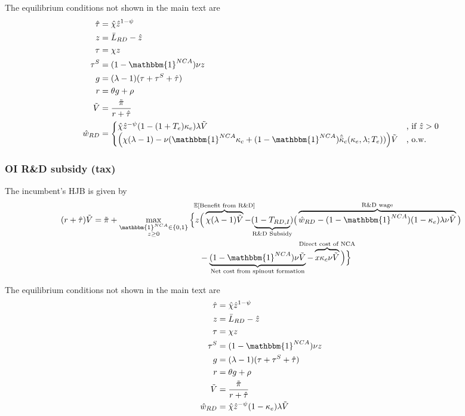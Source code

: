 \documentclass[11pt,english]{article}
\begin{document}
The equilibrium conditions not shown in the main text are
\begin{align}
\hat{\tau} &= \hat{\chi} \hat{z}^{1-\psi} \\
z &= \bar{L}_{RD} - \hat{z} \label{eq:labor_resource_constraint_entryTax}\\ 
\tau &= \chi z \\
\tau^S &= (1-\mathbbm{1}^{NCA}) \nu z \\
g &= (\lambda - 1) (\tau + \tau^S + \hat{\tau}) \\
r &= \theta g + \rho \\
\tilde{V} &= \frac{\tilde{\pi}}{r + \hat{\tau}} \\ 
\hat{w}_{RD} &= \begin{cases}
\hat{\chi} \hat{z}^{-\psi} (1-(1+T_e)\kappa_e) \lambda \tilde{V} &\textrm{, if } \hat{z} > 0\\
\Big( \chi(\lambda -1) - \nu (\mathbbm{1}^{NCA}\kappa_c + (1-\mathbbm{1}^{NCA})\hat{\bar{\kappa}}_c(\kappa_e,\lambda;T_e))\Big) \tilde{V} &\textrm{, o.w.}
\end{cases} \label{eq:wage_rd_labor_entryTax}
\end{align}


\subsubsection{OI R\&D subsidy (tax)}\label{appendix:model:efficiencyderivations:OIRDtax}

The incumbent's HJB is given by
\begin{align}
(r + \hat{\tau}) \tilde{V} = \tilde{\pi} + \max_{\substack{\mathbbm{1}^{NCA} \in \{0,1\} \\ z \ge 0}} \Big\{z &\Big( \overbrace{\chi (\lambda - 1) \tilde{V}}^{\mathclap{\mathbb{E}[\textrm{Benefit from R\&D}]}}- (\underbrace{1-T_{RD,I}}_{\mathclap{\text{R\&D Subsidy}}}) \big( \overbrace{\hat{w}_{RD} - (1-\mathbbm{1}^{NCA})(1-\kappa_e)\lambda \nu \tilde{V}}^{\mathclap{\text{R\&D wage}}}\big) \label{eq:hjb_incumbent_RDsubsidyTargeted} \nonumber \\ 
&-  \underbrace{(1-\mathbbm{1}^{NCA}) \nu \tilde{V}}_{\mathclap{\text{Net cost from spinout formation}}} - \overbrace{x \kappa_{c} \nu \tilde{V}}^{\mathclap{\text{Direct cost of NCA}}}\Big) \Big\} 
\end{align}

The equilibrium conditions not shown in the main text are
\begin{align}
\hat{\tau} &= \hat{\chi} \hat{z}^{1-\psi} \\
z &= \bar{L}_{RD} - \hat{z} \label{eq:labor_resource_constraint_RDsubsidyTargeted}\\ 
\tau &= \chi z \\
\tau^S &= (1-\mathbbm{1}^{NCA}) \nu z \\
g &= (\lambda - 1) (\tau + \tau^S + \hat{\tau}) \\
r &= \theta g + \rho \\
\tilde{V} &= \frac{\tilde{\pi}}{r + \hat{\tau}} \\ 
\hat{w}_{RD} &= \hat{\chi} \hat{z}^{-\psi} (1-\kappa_e) \lambda \tilde{V} \label{eq:wage_rd_labor_RDsubsidyTargeted}
\end{align}
\end{document}
